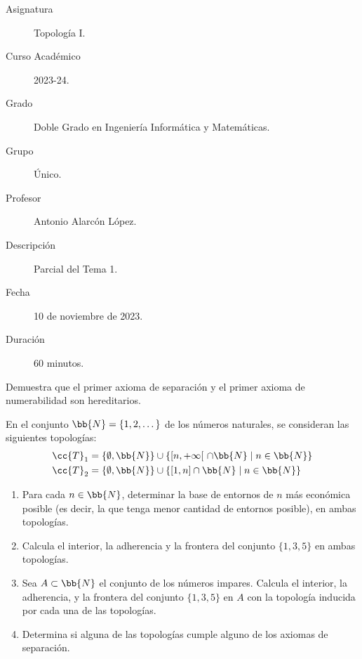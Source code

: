 \documentclass[12pt]{article}
\newcommand{\T}[0]{\cc{T}}
\begin{document}

    
    

    \begin{description}
        \item[Asignatura] Topología I.
        \item[Curso Académico] 2023-24.
        \item[Grado] Doble Grado en Ingeniería Informática y Matemáticas.
        \item[Grupo] Único.
        \item[Profesor] Antonio Alarcón López.
        \item[Descripción] Parcial del Tema 1.
        \item[Fecha] 10 de noviembre de 2023.
        \item[Duración] 60 minutos.
    
    \end{description}
    \newpage
    
    \begin{ejercicio}[4 puntos]
        Demuestra que el primer axioma de separación y el primer axioma de numerabilidad son hereditarios.
    \end{ejercicio}

    \begin{ejercicio}[6 puntos]
        En el conjunto $\bb{N}=\{1,2,\dots\}$  de los números naturales, se consideran las siguientes topologías:
        \begin{equation*}
            \begin{split}
                \T_1&=\{\emptyset, \bb{N}\}\cup \{[n,+\infty[~\cap \bb{N}\mid n\in \bb{N}\}\\\T_2&=\{\emptyset, \bb{N}\}\cup \{[1,n]\cap \bb{N}\mid n\in \bb{N}\}
            \end{split}
        \end{equation*}
        \begin{enumerate}
            \item Para cada $n\in \bb{N}$, determinar la base de entornos de $n$ más económica posible (es decir, la que tenga menor cantidad de entornos posible), en ambas topologías.

            \item Calcula el interior, la adherencia y la frontera del conjunto $\{1,3,5\}$ en ambas topologías.
            \item Sea $A\subset \bb{N}$ el conjunto de los números impares. Calcula el interior, la adherencia, y la frontera del conjunto $\{1,3,5\}$ en $A$ con la topología inducida por cada una de las topologías.

            \item Determina si alguna de las topologías cumple alguno de los axiomas de separación.
        \end{enumerate}
    \end{ejercicio}
\end{document}
